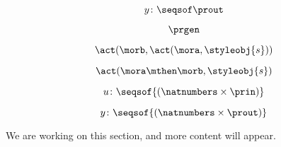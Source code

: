{\begin{forslides}
        \begin{equation}
            \label{eq:prgen-y-2}
            y\colon \seqsof  \prout
        \end{equation}

        \begin{equation}
            \label{eq:prgen}
            \prgen
        \end{equation}

        \begin{equation}
            \label{eq:now1}
            \act(\morb, \act(\mora, \styleobj{s}))
        \end{equation}


        \begin{equation}
            \label{eq:now2}
            \act(\mora\mthen\morb, \styleobj{s})
        \end{equation}

        \begin{equation}
            \label{eq:ev-sign}
            u\colon \seqsof{(\natnumbers \times \prin)}
        \end{equation}

        \begin{equation}
            \label{eq:ev-sign2}
            y\colon \seqsof{(\natnumbers \times \prout)}
        \end{equation}

    \end{forslides}
}

We are working on this section, and more content will appear.

